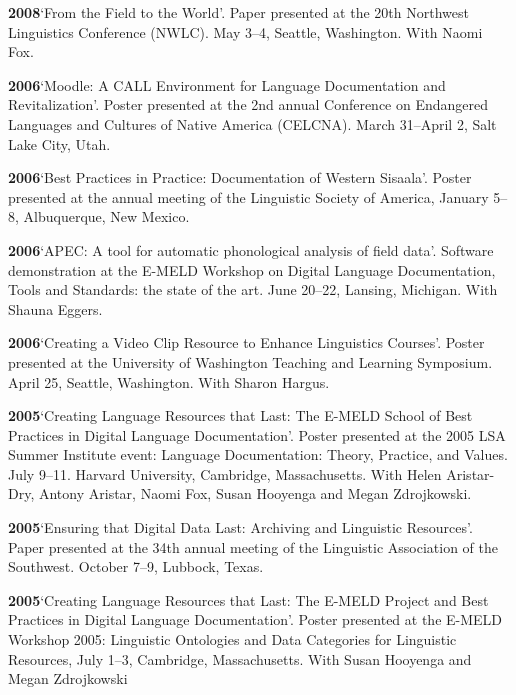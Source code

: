\documentclass[11pt]{article}
\newcommand{\hangpara}{
 \setlength{\parindent}{0in} %
 \hangindent=0.42in %
}
\begin{document}
\vskip 6pt
\hangpara
{\bf 2008}\hspace{1ex}`From the Field to the World'. Paper presented at the 20th Northwest Linguistics Conference (NWLC). May 3--4, Seattle, Washington. With Naomi Fox.

\vskip 6pt
\hangpara
{\bf 2006}\hspace{1ex}`Moodle: A CALL Environment for Language Documentation and Revitalization'. Poster presented at the 2nd annual Conference on Endangered Languages and Cultures of Native America (CELCNA). March 31--April 2, Salt Lake City, Utah.

\vskip 6pt
\hangpara
{\bf 2006}\hspace{1ex}`Best Practices in Practice: Documentation of Western Sisaala'. Poster presented at the annual meeting of the Linguistic Society of America, January 5--8, Albuquerque, New Mexico.

\vskip 6pt
\hangpara
{\bf 2006}\hspace{1ex}`APEC: A tool for automatic phonological analysis of field data'. Software demonstration at the E-MELD Workshop on Digital Language Documentation, Tools and Standards: the state of the art. June 20--22, Lansing, Michigan. With Shauna Eggers.

\vskip 6pt
\hangpara
{\bf 2006}\hspace{1ex}`Creating a Video Clip Resource to Enhance Linguistics Courses'. Poster presented at the University of Washington Teaching and Learning Symposium. April 25, Seattle, Washington. With Sharon Hargus.

\vskip 6pt
\hangpara
{\bf 2005}\hspace{1ex}`Creating Language Resources that Last: The E-MELD School of Best Practices in Digital Language Documentation'. Poster presented at the 2005 LSA Summer Institute event: Language Documentation: Theory, Practice, and Values. July 9--11. Harvard University, Cambridge, Massachusetts. With Helen Aristar-Dry, Antony Aristar, Naomi Fox, Susan Hooyenga and Megan Zdrojkowski.

\vskip 6pt
\hangpara
{\bf 2005}\hspace{1ex}`Ensuring that Digital Data Last: Archiving and Linguistic Resources'. Paper presented at the 34th annual meeting of the Linguistic Association of the Southwest. October 7--9, Lubbock, Texas. 
 
\vskip 6pt
\hangpara
{\bf 2005}\hspace{1ex}`Creating Language Resources that Last: The E-MELD Project and Best Practices in Digital Language Documentation'. Poster presented at the E-MELD Workshop 2005: Linguistic Ontologies and Data Categories for Linguistic Resources, July 1--3, Cambridge, Massachusetts. With Susan Hooyenga and Megan Zdrojkowski
\end{document}
